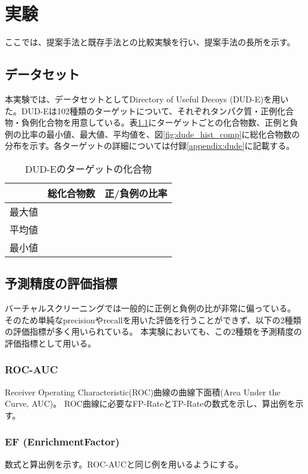 \chapter{実験}
ここでは、提案手法と既存手法との比較実験を行い、提案手法の長所を示す。

\section{データセット}
本実験では、データセットとしてDirectory of Useful Decoys (DUD-E)\cite{Mysinger2012}を用いた。DUD-Eは102種類のターゲットについて、それぞれタンパク質・正例化合物・負例化合物を用意している。表\ref{table:dude}にターゲットごとの化合物数、正例と負例の比率の最小値、最大値、平均値を、図\ref{fig:dude_hist_comp}に総化合物数の分布を示す。各ターゲットの詳細については付録\ref{appendix:dude}に記載する。

\begin{table}[htb] \centering
	\caption{DUD-Eのターゲットの化合物}
	\label {table:dude}
	\begin{tabular}{c|ll|}
			&総化合物数	&正/負例の比率	\\ \hline
	最大値	&			&				\\
	平均値	&			&				\\
	最小値	&			&				\\ \hline
	\end{tabular}
\end{table}
	
\section{予測精度の評価指標}
バーチャルスクリーニングでは一般的に正例と負例の比が非常に偏っている。
そのため単純なprecisionやrecallを用いた評価を行うことができず、以下の2種類の評価指標が多く用いられている。
本実験においても、この2種類を予測精度の評価指標として用いる。

\subsection{ROC-AUC}
Receiver Operating Characteristic(ROC)曲線の曲線下面積(Area Under the Curve, AUC)。
ROC曲線に必要なFP-RateとTP-Rateの数式を示し、算出例を示す。

\subsection{EF (EnrichmentFactor)}
数式と算出例を示す。ROC-AUCと同じ例を用いるようにする。



